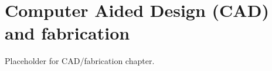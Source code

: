 \setchapterpreamble[u]{\margintoc}
\chapter{\color{gray} Computer Aided Design (CAD) and fabrication \color{black}}

Placeholder for CAD/fabrication chapter.
